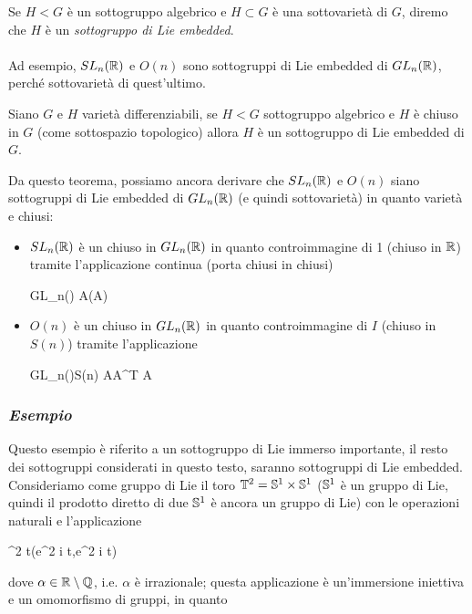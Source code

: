 Se $ H < G $ è un  sottogruppo algebrico e $ H \subset G $ è una sottovarietà di $ G $, diremo che $ H $ è un \textit{sottogruppo di Lie embedded}.\\\\
%
Ad esempio, $ SL_{n}(\R) $ e $ O(n) $ sono sottogruppi di Lie embedded di $ GL_{n}(\R) $, perché sottovarietà di quest'ultimo.

\begin{theorem}\label{thm:liesub-var}
	Siano $ G $ e $ H $ varietà differenziabili, se $ H < G $ sottogruppo algebrico e $ H $ è chiuso in $ G $ (come sottospazio topologico) allora $ H $ è un sottogruppo di Lie embedded di $ G $.
\end{theorem}

Da questo teorema, possiamo ancora derivare che $ SL_{n}(\R) $ e $ O(n) $ siano sottogruppi di Lie embedded di $ GL_{n}(\R) $ (e quindi sottovarietà) in quanto varietà e chiusi:

\begin{itemize}
	\item $ SL_{n}(\R) $ è un chiuso in $ GL_{n}(\R) $ in quanto controimmagine di 1 (chiuso in $ \R $) tramite l'applicazione continua (porta chiusi in chiusi)
	
		{GL_{n}(\R)}{\R}
		{A}{\det(A)}
	
	\item $ O(n) $ è un chiuso in $ GL_{n}(\R) $ in quanto controimmagine di $ I $ (chiuso in $ S(n) $) tramite l'applicazione
	
		{GL_{n}(\R)}{S(n)}
		{A}{A^{T} A}
\end{itemize}

\subsubsection{\textit{Esempio}}

Questo esempio è riferito a un sottogruppo di Lie immerso importante, il resto dei sottogruppi considerati in questo testo, saranno sottogruppi di Lie embedded.\\
Consideriamo come gruppo di Lie il toro $ \T^{2} = \S^{1} \times \S^{1} $ ($ \S^{1} $ è un gruppo di Lie, quindi il prodotto diretto di due $ \S^{1} $ è ancora un gruppo di Lie) con le operazioni naturali e l'applicazione

	{\R}{\T^{2}}
	{t}{(e^{2 \pi i t},e^{2 \pi i \alpha t})}

dove $ \alpha \in \R \setminus \Q $, i.e. $ \alpha $ è irrazionale; questa applicazione è un'immersione iniettiva e un omomorfismo di gruppi, in quanto

